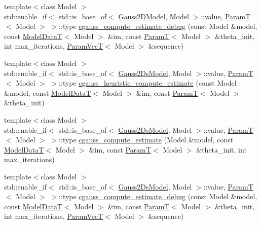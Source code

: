 \begin{DoxyCompactItemize}
\item 
{\footnotesize template$<$class Model $>$ }\\std\+::enable\+\_\+if$<$ std\+::is\+\_\+base\+\_\+of$<$ \hyperlink{classmappel_1_1Gauss2DModel}{Gauss2\+D\+Model}, Model $>$\+::value, \hyperlink{namespacemappel_a667925cb0d6c0e49f2f035cc5a9a6857}{ParamT}$<$ Model $>$ $>$\+::type \hyperlink{namespacemappel_a73c162e4b173ebab8e40ab47f86a72ae}{cgauss\+\_\+compute\+\_\+estimate\+\_\+debug} (const Model \&model, const \hyperlink{namespacemappel_a97f050df953605381ae9c901c3b125f1}{Model\+DataT}$<$ Model $>$ \&im, const \hyperlink{namespacemappel_a667925cb0d6c0e49f2f035cc5a9a6857}{ParamT}$<$ Model $>$ \&theta\+\_\+init, int max\+\_\+iterations, \hyperlink{namespacemappel_a0f86d3153e4e27b095012f140eea58de}{Param\+VecT}$<$ Model $>$ \&sequence)
\item 
{\footnotesize template$<$class Model $>$ }\\std\+::enable\+\_\+if$<$ std\+::is\+\_\+base\+\_\+of$<$ \hyperlink{classmappel_1_1Gauss2DsModel}{Gauss2\+Ds\+Model}, Model $>$\+::value, \hyperlink{namespacemappel_a667925cb0d6c0e49f2f035cc5a9a6857}{ParamT}$<$ Model $>$ $>$\+::type \hyperlink{namespacemappel_aea7be2269d074757627dbe685484607c}{cgauss\+\_\+heuristic\+\_\+compute\+\_\+estimate} (const Model \&model, const \hyperlink{namespacemappel_a97f050df953605381ae9c901c3b125f1}{Model\+DataT}$<$ Model $>$ \&im, const \hyperlink{namespacemappel_a667925cb0d6c0e49f2f035cc5a9a6857}{ParamT}$<$ Model $>$ \&theta\+\_\+init)
\item 
{\footnotesize template$<$class Model $>$ }\\std\+::enable\+\_\+if$<$ std\+::is\+\_\+base\+\_\+of$<$ \hyperlink{classmappel_1_1Gauss2DsModel}{Gauss2\+Ds\+Model}, Model $>$\+::value, \hyperlink{namespacemappel_a667925cb0d6c0e49f2f035cc5a9a6857}{ParamT}$<$ Model $>$ $>$\+::type \hyperlink{namespacemappel_aa242fbe6915d17d31a3cce1c5a45634e}{cgauss\+\_\+compute\+\_\+estimate} (Model \&model, const \hyperlink{namespacemappel_a97f050df953605381ae9c901c3b125f1}{Model\+DataT}$<$ Model $>$ \&im, const \hyperlink{namespacemappel_a667925cb0d6c0e49f2f035cc5a9a6857}{ParamT}$<$ Model $>$ \&theta\+\_\+init, int max\+\_\+iterations)
\item 
{\footnotesize template$<$class Model $>$ }\\std\+::enable\+\_\+if$<$ std\+::is\+\_\+base\+\_\+of$<$ \hyperlink{classmappel_1_1Gauss2DsModel}{Gauss2\+Ds\+Model}, Model $>$\+::value, \hyperlink{namespacemappel_a667925cb0d6c0e49f2f035cc5a9a6857}{ParamT}$<$ Model $>$ $>$\+::type \hyperlink{namespacemappel_a600985daaf7683877334c37212a23640}{cgauss\+\_\+compute\+\_\+estimate\+\_\+debug} (const Model \&model, const \hyperlink{namespacemappel_a97f050df953605381ae9c901c3b125f1}{Model\+DataT}$<$ Model $>$ \&im, const \hyperlink{namespacemappel_a667925cb0d6c0e49f2f035cc5a9a6857}{ParamT}$<$ Model $>$ \&theta\+\_\+init, int max\+\_\+iterations, \hyperlink{namespacemappel_a0f86d3153e4e27b095012f140eea58de}{Param\+VecT}$<$ Model $>$ \&sequence)

\end{DoxyCompactItemize}
